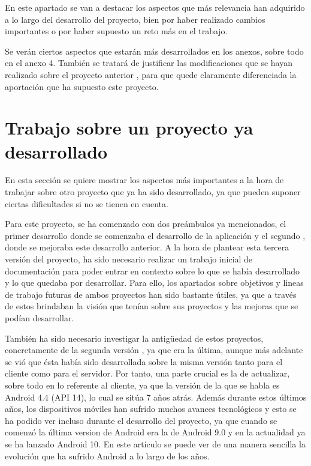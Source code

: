 
En este apartado se van a destacar los aspectos que más relevancia han adquirido a lo largo del desarrollo del proyecto, bien por haber realizado cambios importantes o por haber supuesto un reto más en el trabajo.

Se verán ciertos aspectos que estarán más desarrollados en los anexos, sobre todo en el anexo 4. También se tratará de justificar las modificaciones que se hayan realizado sobre el proyecto anterior \cite{tfm1}, para que quede claramente diferenciada la aportación que ha supuesto este proyecto.

\section{Trabajo sobre un proyecto ya desarrollado}

En esta sección se quiere mostrar los aspectos más importantes a la hora de trabajar sobre otro proyecto que ya ha sido desarrollado, ya que pueden suponer ciertas dificultades si no se tienen en cuenta.

Para este proyecto, se ha comenzado con dos preámbulos ya mencionados, el primer desarrollo \cite{tfg1} donde se comenzaba el desarrollo de la aplicación y el segundo \cite{tfm1}, donde se mejoraba este desarrollo anterior. A la hora de plantear esta tercera versión del proyecto, ha sido necesario realizar un trabajo inicial de documentación para poder entrar en contexto sobre lo que se había desarrollado y lo que quedaba por desarrollar. Para ello, los apartados sobre objetivos y lineas de trabajo futuras de ambos proyectos han sido bastante útiles, ya que a través de estos brindaban la visión que tenían sobre sus proyectos y las mejoras que se podían desarrollar.

También ha sido necesario investigar la antigüedad de estos proyectos, concretamente de la segunda versión \cite{tfm1}, ya que era la última, aunque más adelante se vió que ésta había sido desarrollada sobre la misma versión tanto para el cliente como para el servidor. Por tanto, una parte crucial es la de actualizar, sobre todo en lo referente al cliente, ya que la versión de la que se habla es Android 4.4 (API 14), lo cual se sitúa 7 años atrás. Además durante estos últimos años, los dispositivos móviles han sufrido muchos avances tecnológicos y esto se ha podido ver incluso durante el desarrollo del proyecto, ya que cuando se comenzó la última version de Android era la de Android 9.0 y en la actualidad ya se ha lanzado Android 10. En este artículo \cite{and1} se puede ver de una manera sencilla la evolución que ha sufrido Android a lo largo de los años.

